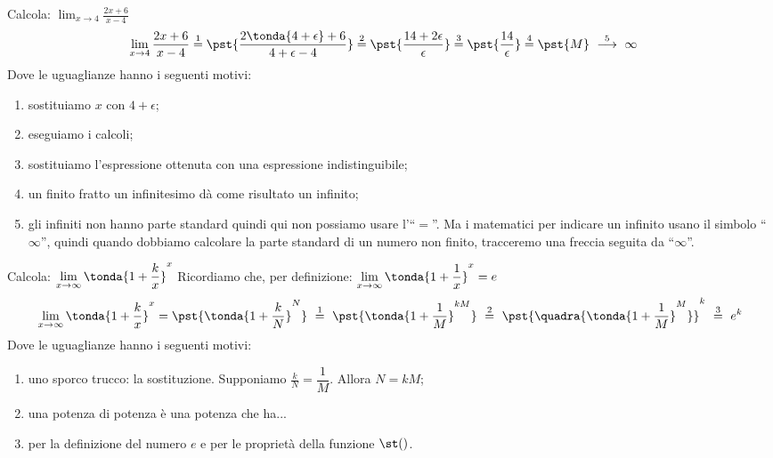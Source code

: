 \begin{esempio}
Calcola: \quad 
  \(\displaystyle \lim_{x \rightarrow 4} \frac{2x+6}{x-4}\)
\begin{align*}
\lim_{x \rightarrow 4} \frac{2x+6}{x-4} & \stackrel{1}{=} 
  \pst{\frac{2\tonda{4+\epsilon}+6}{4+\epsilon-4}} \stackrel{2}{=}  
  \pst{\frac{14 + 2 \epsilon}{\epsilon}} \stackrel{3}{=} 
  \pst{\frac{14}{\epsilon}} \stackrel{4}{=} 
  \pst{M} \stackrel{5}{~\longrightarrow~} \infty
\end{align*}
Dove le uguaglianze hanno i seguenti motivi:
\begin{enumerate} [nosep]
 \item sostituiamo $x$ con \(4+\epsilon\);
 \item eseguiamo i calcoli;
 \item sostituiamo l'espressione ottenuta con una espressione 
   indistinguibile;
 \item un finito fratto un infinitesimo dà come risultato un infinito; 
 \item gli infiniti non hanno parte standard quindi qui non possiamo usare 
l'``$=$''. Ma i matematici per indicare un infinito usano il simbolo 
``\(\infty\)'', quindi quando dobbiamo calcolare la parte standard di un 
numero non finito, tracceremo una freccia seguita da ``\(\infty\)''.
\end{enumerate}
\end{esempio}

\begin{esempio}
Calcola: \quad 
  \(\displaystyle \lim_{x \rightarrow \infty} \tonda{1+\dfrac{k}{x}}^x\)
Ricordiamo che, per definizione:  
\(\displaystyle 
  \lim_{x \rightarrow \infty} \tonda{1+\dfrac{1}{x}}^x = e\)
\begin{align*}
 \lim_{x \rightarrow \infty} \tonda{1+\dfrac{k}{x}}^x =
 \pst{\tonda{1+\dfrac{k}{N}}^N}
~ \stackrel{1}{=} ~  
\pst{\tonda{1+\dfrac{1}{M}}^{kM}}
~ \stackrel{2}{=} ~
\pst{\quadra{\tonda{1+\dfrac{1}{M}}^M}}^k
~ \stackrel{3}{=} ~ e^k
\end{align*}
Dove le uguaglianze hanno i seguenti motivi:
\begin{enumerate} [nosep]
 \item uno sporco trucco: la sostituzione. Supponiamo
$\frac{k}{N}=\dfrac{1}{M}$. Allora $N=kM$;
 \item una potenza di potenza è una potenza che ha...
 \item per la definizione del numero $e$ e per le proprietà della funzione 
$\st()$.
\end{enumerate}
\end{esempio}

